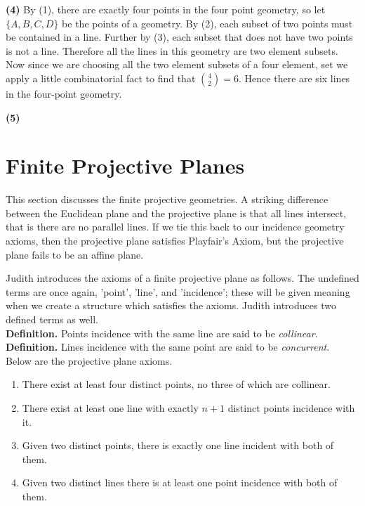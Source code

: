 \documentclass[12pt]{book}
\def\header #1{\noindent\textbf{#1}}
\begin{document}
\textbf{(4)} By (1), there are exactly four points in the four point geometry, so let $\{A,B,C,D\}$ be the points of a geometry. By (2), each subset of two points must be contained in a line. Further by (3), each subset that does not have two points is not a line. Therefore all the lines in this geometry are two element subsets. Now since we are choosing all the two element subsets of a four element, set we apply a little combinatorial fact to find that $\binom{4}{2}=6$. Hence there are six lines in the four-point geometry.

\textbf{(5)}

\section{Finite Projective Planes}
This section discusses the finite projective geometries. A striking difference between the Euclidean plane and the projective plane is that all lines intersect, that is there are no parallel lines. If we tie this back to our incidence geometry axioms, then the projective plane satisfies Playfair's Axiom, but the projective plane fails to be an affine plane.

Judith introduces the axioms of a finite projective plane as follows. The undefined terms are once again, 'point', 'line', and 'incidence'; these will be given meaning when we create a structure which satisfies the axioms. Judith introduces two defined terms as well.\\

\header{Definition.} Points incidence with the same line are said to be \textit{collinear}.\\

\header{Definition.} Lines incidence with the same point are said to be \textit{concurrent}.\\

Below are the projective plane axioms.\\

\begin{enumerate}[label=\textbf{Axiom P\arabic*.}, nolistsep]
\item There exist at least four distinct points, no three of which are collinear.
\item There exist at least one line with exactly $n+1$ distinct points incidence with it.
\item Given two distinct points, there is exactly one line incident with both of them.
\item Given two distinct lines there is at least one point incidence with both of them. \\
\end{enumerate}
\end{document}
